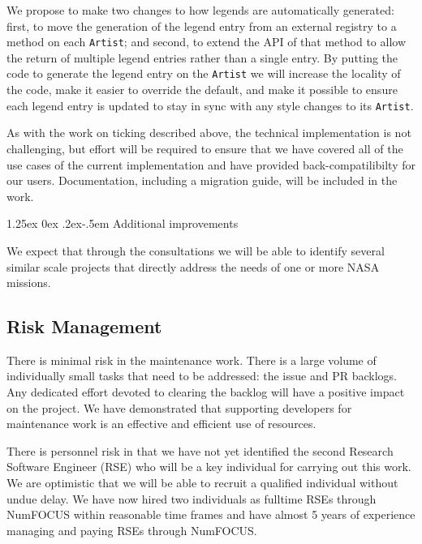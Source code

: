 \documentclass[12pt]{article}
\makeatletter
\numberwithin{page}{section}
\renewcommand{\paragraph}{%
  \@startsection{paragraph}{4}%
  {\z@}{1.25ex \@plus 0ex \@minus .2ex}{-.5em}%
  {\normalfont\normalsize\itshape\bfseries}%
}
\makeatother
\begin{document}
We propose to make two changes to how legends are automatically generated: first,
to move the generation of the legend entry from an external registry to a
method on each \texttt{Artist}; and second, to extend the API of that method to
allow the return of multiple legend entries rather than a single entry.  By
putting the code to generate the legend entry on the \texttt{Artist} we will
increase the locality of the code, make it easier to override the default, and
make it possible to ensure each legend entry is updated to stay in sync with any
style changes to its \texttt{Artist}.

As with the work on ticking described above, the technical implementation is not
challenging, but effort will be required to ensure that we have covered all of the use cases of the current
implementation and have provided back-compatilibilty for our users.
Documentation,
including a migration guide, will be included in the work.

\paragraph{Additional improvements}

We expect that through the consultations we will be able to identify several
similar scale projects that directly address the needs of one or more NASA
missions.

\subsection{Risk Management}

There is minimal risk in the maintenance work.  There is a large volume
of individually small tasks that need to be addressed: the issue and
PR backlogs.  Any dedicated effort devoted to clearing the backlog
will have a positive impact on the project.  We have demonstrated that
supporting developers for maintenance work is an effective and
efficient use of resources.


There is personnel risk in that we have not yet identified the second Research
Software Engineer (RSE) who will be a key individual for carrying out this
work.  We are optimistic that we will be able to recruit a qualified
individual without undue delay.  We have now hired two individuals as fulltime
RSEs through NumFOCUS within reasonable time frames and have almost 5 years of
experience managing and paying RSEs through NumFOCUS.
\end{document}
